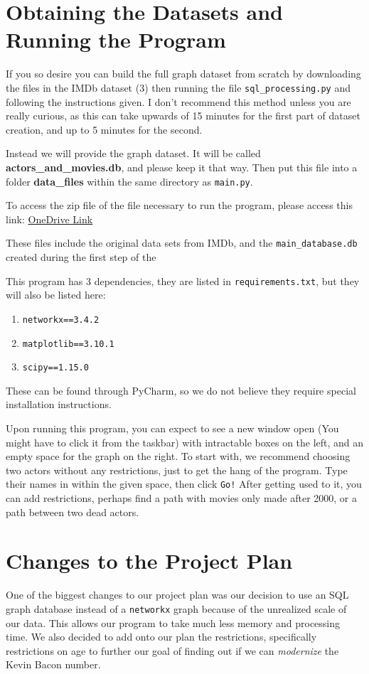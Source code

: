 \documentclass{article}
\begin{document}
\section{Obtaining the Datasets and Running the Program}
If you so desire you can build the full graph dataset from scratch by downloading the files in the IMDb dataset (3) then running the file \verb!sql_processing.py! and following the instructions given. I don't recommend this method unless you are really curious, as this can take upwards of 15 minutes for the first part of dataset creation, and up to 5 minutes for the second.

Instead we will provide the graph dataset. It will be called \textbf{actors\_and\_movies.db}, and please keep it that way. Then put this file into a folder \textbf{data\_files} within the same directory as \verb!main.py!.

To access the zip file of the file necessary to run the program, please access this link: \href{https://utoronto-my.sharepoint.com/:u:/g/personal/nabhan_rashid_mail_utoronto_ca/EYMbuqB8-ARIrHxDK7YhbWkBS4cH6Imba-6myQPnr1z57w?e=JQY8F9}{OneDrive Link}

These files include the original data sets from IMDb, and the \verb!main_database.db! created during the first step of the

This program has 3 dependencies, they are listed in \verb!requirements.txt!, but they will also be listed here:
\begin{enumerate}
\item \verb!networkx==3.4.2!
\item \verb!matplotlib==3.10.1!
\item \verb!scipy==1.15.0!
\end{enumerate}
These can be found through PyCharm, so we do not believe they require special installation instructions.

Upon running this program, you can expect to see a new window open (You might have to click it from the taskbar) with intractable boxes on the left, and an empty space for the graph on the right. To start with, we recommend choosing two actors without any restrictions, just to get the hang of the program. Type their names in within the given space, then click \verb+Go!+ After getting used to it, you can add restrictions, perhaps find a path with movies only made after 2000, or a path between two dead actors.

\section{Changes to the Project Plan}
One of the biggest changes to our project plan was our decision to use an SQL graph database instead of a \verb!networkx! graph because of the unrealized scale of our data. This allows our program to take much less memory and processing time. We also decided to add onto our plan the restrictions, specifically restrictions on age to further our goal of finding out if we can \emph{modernize} the Kevin Bacon number.
\end{document}
